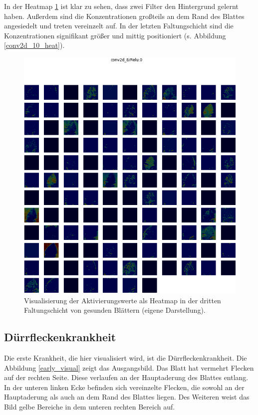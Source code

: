 In der Heatmap \ref{conv2d_8_healthy} ist klar zu sehen, dass zwei Filter den Hintergrund gelernt haben. Außerdem sind die Konzentrationen großteils an dem Rand des Blattes angesiedelt und treten vereinzelt auf. In der letzten Faltungschicht sind die Konzentrationen signifikant größer und mittig positioniert (s. Abbildung \ref{conv2d_10_heat}).

\begin{figure}[h!]
	\centering
	\includegraphics[width=\textwidth]{visualisierungen/healthy/heatmap_mit/conv2d_8.png}
	\caption{Visualisierung der Aktivierungswerte als Heatmap in der dritten Faltungschicht von gesunden Blättern (eigene Darstellung).}
	\label{conv2d_8_healthy}
\end{figure}

\newpage
\subsection{Dürrfleckenkrankheit}

Die erste Krankheit, die hier visualisiert wird, ist die Dürrfleckenkrankheit. Die Abbildung \ref{early_visual} zeigt das Ausgangsbild. Das Blatt hat vermehrt Flecken auf der rechten Seite. Diese verlaufen an der Hauptaderung des Blattes entlang. In der unteren linken Ecke befinden sich vereinzelte Flecken, die sowohl an der Hauptaderung als auch an dem Rand des Blattes liegen. Des Weiteren weist das Bild gelbe Bereiche in dem unteren rechten Bereich auf.


